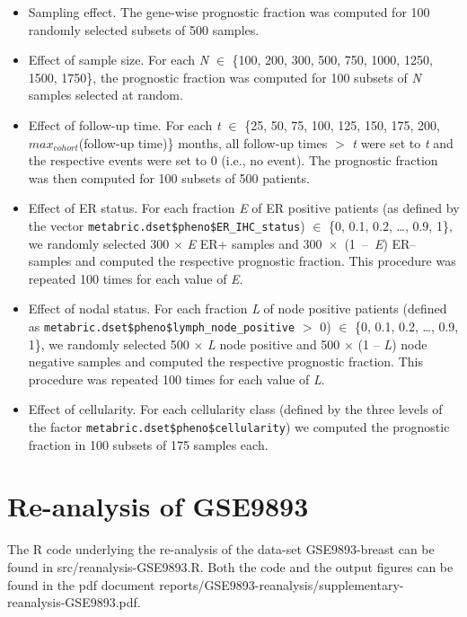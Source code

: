 \begin{itemize}
\item Sampling effect.  The gene-wise prognostic fraction was computed for 100
  randomly selected subsets of 500 samples.
\item Effect of sample size.  For each \emph{N} $\in$ \{100, 200, 300, 500, 750,
  1000, 1250, 1500, 1750\}, the prognostic fraction was computed for 100 subsets
  of \emph{N} samples selected at random.
\item Effect of follow-up time.  For each \emph{t} $\in$ \{25, 50, 75, 100, 125,
  150, 175, 200, $max_{cohort}$(follow-up time)\} months, all follow-up times
  $>$ \emph{t} were set to \emph{t} and the respective events were set to 0
  (i.e., no event).  The prognostic fraction was then computed for 100 subsets
  of 500 patients.
\item Effect of ER status.  For each fraction \emph{E} of ER positive patients
  (as defined by the vector \texttt{metabric.dset\$pheno\$ER\_IHC\_status})
  $\in$ \{0, 0.1, 0.2, \ldots{}, 0.9, 1\}, we randomly selected 300 $\times$
  \emph{E} ER+ samples and \mbox{300 $\times$ (1 -- \emph{E})} ER-- samples and
  computed the respective prognostic fraction.  This procedure was repeated 100
  times for each value of \emph{E}.
\item Effect of nodal status.  For each fraction \emph{L} of node positive
  patients (defined as \texttt{metabric.dset\$pheno\$lymph\_node\_positive} $>$
  0) $\in$ \{0, 0.1, 0.2, \ldots{}, 0.9, 1\}, we
  randomly selected 500 $\times$ \emph{L} node positive and 500 $\times$ (1 --
  \emph{L}) node negative samples and computed the respective prognostic
  fraction.  This procedure was repeated 100 times for each value of \emph{L}.
\item Effect of cellularity.  For each cellularity class (defined by the three
  levels of the factor \texttt{metabric.dset\$pheno\$cellularity}) we computed
  the prognostic fraction in 100 subsets of 175 samples each.
\end{itemize}

\section{Re-analysis of GSE9893}
The \textsf{R} code underlying the re-analysis of the data-set
\textsf{GSE9893-breast} can be found in \textsf{src/reanalysis-GSE9893.R}.  Both
the code and the output figures can be found in the pdf document
\textsf{reports/GSE9893-reanalysis/supplementary-reanalysis-GSE9893.pdf}.

